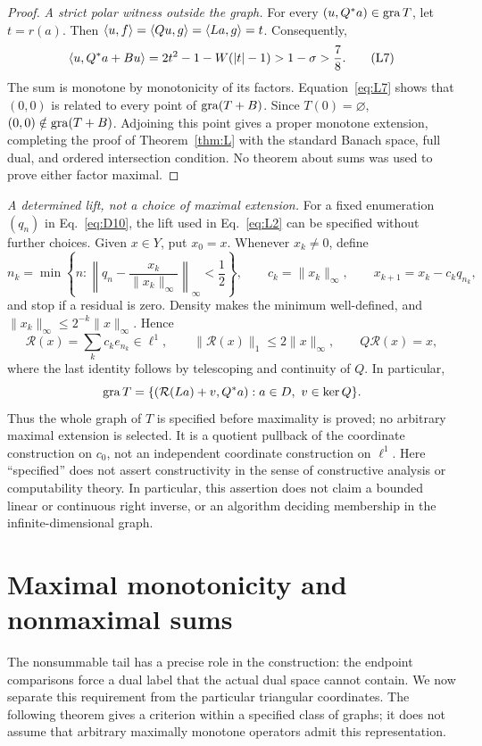 \begin{proof}
\noindent\textit{A strict polar witness outside the graph.}
\label{sec:L5}
For every $(u,Q^*a)\in\operatorname{gra} T$, let $t=r(a)$. Then
$\langle u,f\rangle=\langle Qu,g\rangle=\langle La,g\rangle=t$.
Consequently,
\begin{equation}
\langle u,Q^*a+Bu\rangle
 =2t^2-1-W(|t|-1)>1-\sigma>\frac{7}{8}.
\tag{L7}\label{eq:L7}
\end{equation}
The sum is monotone by monotonicity of its factors.
Equation~\eqref{eq:L7} shows that $(0,0)$ is related to every point of $\operatorname{gra}(T+B)$.
Since $T(0)=\varnothing$, $(0,0)\notin\operatorname{gra}(T+B)$. Adjoining this point
gives a proper monotone extension, completing the proof of
Theorem~\ref{thm:L} with the standard Banach space, full dual, and ordered
intersection condition. No theorem about sums was used to prove either
factor maximal.
\end{proof}

\noindent\textit{A determined lift, not a choice of maximal extension.}
For a fixed enumeration $(q_n)$ in Eq.~\eqref{eq:D10}, the lift used in
Eq.~\eqref{eq:L2} can be specified without further choices. Given $x\in Y$,
put $x_0=x$. Whenever $x_k\ne0$, define
\[
n_k=\min\left\{n:\left\|q_n-\frac{x_k}{\|x_k\|_\infty}\right\|_\infty
 <\frac12\right\},\qquad
c_k=\|x_k\|_\infty,\qquad x_{k+1}=x_k-c_kq_{n_k},
\]
and stop if a residual is zero. Density makes the minimum well-defined,
and $\|x_k\|_\infty\le2^{-k}\|x\|_\infty$. Hence
\[
\mathcal R(x)=\sum_k c_ke_{n_k}\in\ell^1,\qquad
\|\mathcal R(x)\|_1\le2\|x\|_\infty,\qquad
Q\mathcal R(x)=x,
\]
where the last identity follows by telescoping and continuity of $Q$.
In particular,
\[
\operatorname{gra} T=\{(\mathcal R(La)+v,Q^*a):a\in D,\ v\in\ker Q\}.
\]
Thus the whole graph of $T$ is specified before maximality is proved;
no arbitrary maximal extension is selected. It is a quotient pullback of
the coordinate construction on $c_0$, not an independent coordinate
construction on $\ell^1$. Here ``specified'' does not assert constructivity
in the sense of constructive analysis or computability theory. In particular,
this assertion does not
claim a bounded linear or continuous right inverse, or an algorithm
deciding membership in the infinite-dimensional graph.


\section{Maximal monotonicity and nonmaximal sums}
\label{sec:endpoint-criterion}
The nonsummable tail has a precise role in the construction: the endpoint
comparisons force a dual label that the actual dual space cannot contain.
We now separate this requirement from the particular triangular coordinates.
The following theorem gives a criterion within a specified class of graphs;
it does not assume that arbitrary maximally monotone operators admit this
representation.

